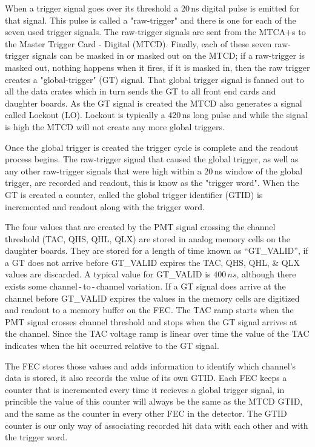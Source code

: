 When a trigger signal goes over its threshold a 20\,ns digital pulse is
emitted for that signal. This pulse is called a "raw-trigger" and there is
one for each of the seven used trigger signals.
The raw-trigger signals are sent from the MTCA+s to the Master Trigger
Card - Digital (MTCD).
Finally, each of these seven raw-trigger signals can be masked in or masked out on
the MTCD;
if a raw-trigger is masked out, nothing happens when it fires,
if it is masked in, then the raw trigger creates a "global-trigger" (GT) signal.
That global trigger signal is fanned out to all the data crates which
in turn sends the GT to all front end cards and daughter boards.
As the GT signal is created the MTCD also generates a signal
called Lockout (LO). Lockout is typically a 420\,ns long pulse and while
the signal is high the MTCD will not create any more global triggers.

Once the global trigger is created the trigger cycle is complete and
the readout process begins.
The raw-trigger signal that caused the global trigger, as well as any other
raw-trigger signals that were high within a 20\,ns window of the global trigger,
are recorded and readout, this is know as the "trigger word".
When the GT is created a counter, called the global trigger identifier (GTID) is incremented
and readout along with the trigger word.

The four values that are created by the PMT signal crossing
the channel threshold (TAC, QHS, QHL, QLX) are stored in analog memory
cells on the daughter boards.
They are stored for a length of time known as ``GT\_VALID'', if
a GT does not arrive before GT\_VALID expires the TAC, QHS, QHL, \& QLX values
are discarded. A typical value for GT\_VALID is $400\,ns$, although
there exists some channel\,-\,to\,-\,channel variation.
If a GT signal does arrive at the channel before GT\_VALID expires the
values in the memory cells are digitized and readout to a memory buffer
on the FEC.
The TAC ramp starts when the PMT signal crosses channel threshold
and stops when the GT signal arrives at the channel.
Since the TAC voltage ramp is linear over time the value of the TAC
indicates when the hit occurred relative to the GT signal.

The FEC stores those values and adds information to identify which
channel's data is stored, it also records the value of its own GTID.
Each FEC keeps a counter that is incremented every time it recieves a global
trigger signal, in princible the value of this counter will always be the same
as the MTCD GTID, and the same as the counter in every other FEC in the detector.
The GTID counter is our only way of associating recorded hit data with each other
and with the trigger word.

